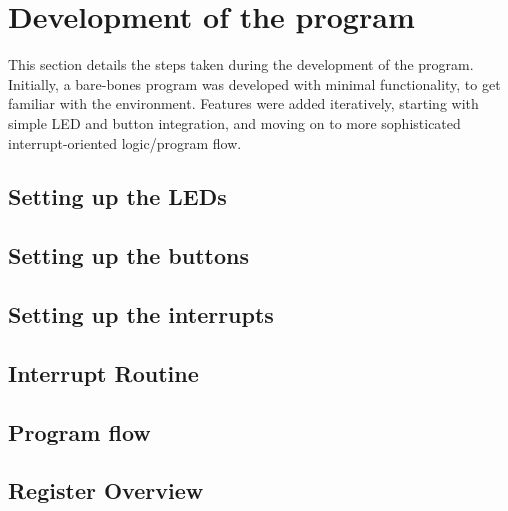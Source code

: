         

\section{Development of the program}

This section details the steps taken during the development of the program.
Initially, a bare-bones program was developed with minimal functionality, to get familiar with the environment.
Features were added iteratively, starting with simple LED and button integration, and moving on to more sophisticated interrupt-oriented logic/program flow.

    \subsection{Setting up the LEDs}
        
        

    \subsection{Setting up the buttons}

        

    \subsection{Setting up the interrupts}

        

    \subsection{Interrupt Routine}
        

    \subsection{Program flow}

        

    \subsection{Register Overview}

        

